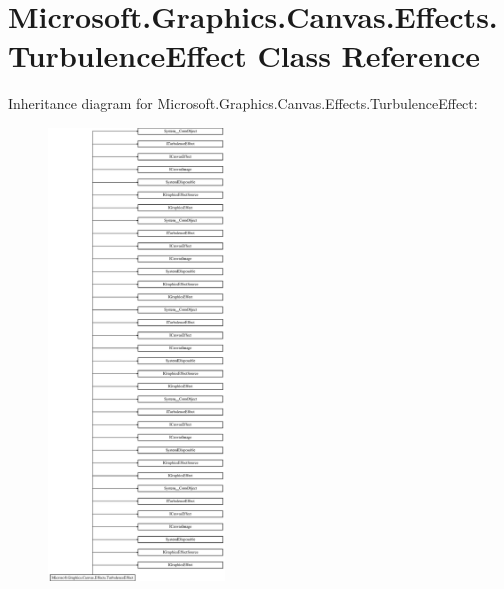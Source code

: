\hypertarget{class_microsoft_1_1_graphics_1_1_canvas_1_1_effects_1_1_turbulence_effect}{}\section{Microsoft.\+Graphics.\+Canvas.\+Effects.\+Turbulence\+Effect Class Reference}
\label{class_microsoft_1_1_graphics_1_1_canvas_1_1_effects_1_1_turbulence_effect}
Inheritance diagram for Microsoft.\+Graphics.\+Canvas.\+Effects.\+Turbulence\+Effect\+:\begin{figure}[H]
\begin{center}
\leavevmode
\includegraphics[height=12.000000cm]{class_microsoft_1_1_graphics_1_1_canvas_1_1_effects_1_1_turbulence_effect}
\end{center}
\end{figure}
